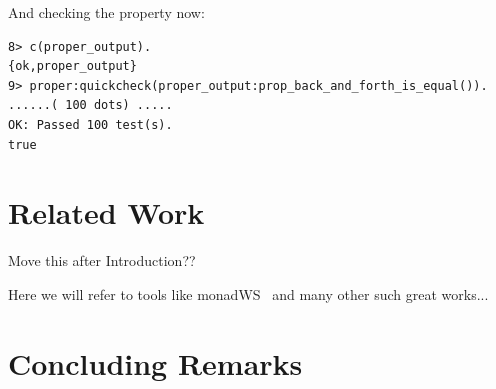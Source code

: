 \documentclass[submission,copyright,a4]{eptcs}
\begin{document}
And checking the property now:

\begin{lstlisting}
8> c(proper_output).                                                  
{ok,proper_output}
9> proper:quickcheck(proper_output:prop_back_and_forth_is_equal()).
......( 100 dots) .....
OK: Passed 100 test(s).
true
\end{lstlisting}

\section{Related Work}
Move this after Introduction??

Here we will refer to tools like monadWS~\cite{monadWS@AST-11} and
many other such great works...

\section{Concluding Remarks}



\end{document}
